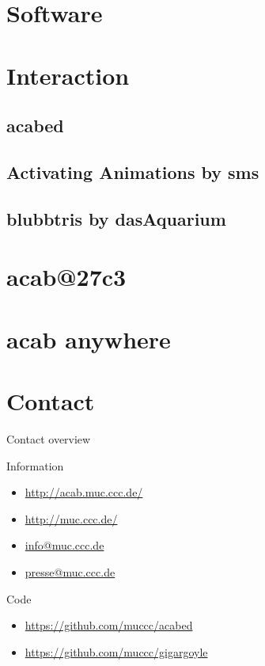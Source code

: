 \documentclass{beamer}
\begin{document}
\section{Software}
\section{Interaction}
    \subsection{acabed}
    \subsection{Activating Animations by sms}
    \subsection{blubbtris by dasAquarium}
\section{acab@27c3}

\section{acab anywhere}
\section{Contact}
\begin{frame}{Contact overview}
  \begin{block}{Information}
    \begin{itemize}
      \item \url{http://acab.muc.ccc.de/}
      \item \url{http://muc.ccc.de/}
      \item \url{info@muc.ccc.de}
      \item \url{presse@muc.ccc.de}
    \end{itemize}
  \end{block}
  \begin{block}{Code}
    \begin{itemize}
      \item \url{https://github.com/muccc/acabed}
      \item \url{https://github.com/muccc/gigargoyle}
    \end{itemize}
  \end{block}
\end{frame}
\end{document}
